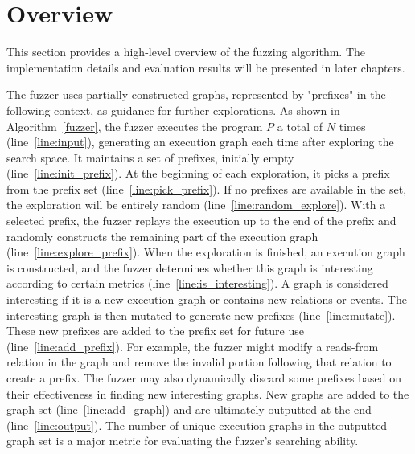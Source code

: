 \section{Overview}



This section provides a high-level overview of the fuzzing algorithm. The implementation details and evaluation results will be presented in later chapters.





The fuzzer uses partially constructed graphs, represented by "prefixes" in the following context, as guidance for further explorations. As shown in Algorithm~\ref{fuzzer}, the fuzzer executes the program $P$ a total of $N$ times (line~\ref{line:input}), generating an execution graph each time after exploring the search space. It maintains a set of prefixes, initially empty (line~\ref{line:init_prefix}). At the beginning of each exploration, it picks a prefix from the prefix set (line~\ref{line:pick_prefix}). If no prefixes are available in the set, the exploration will be entirely random (line~\ref{line:random_explore}). With a selected prefix, the fuzzer replays the execution up to the end of the prefix and randomly constructs the remaining part of the execution graph (line~\ref{line:explore_prefix}). When the exploration is finished, an execution graph is constructed, and the fuzzer determines whether this graph is interesting according to certain metrics (line~\ref{line:is_interesting}). A graph is considered interesting if it is a new execution graph or contains new relations or events. The interesting graph is then mutated to generate new prefixes (line~\ref{line:mutate}). These new prefixes are added to the prefix set for future use (line~\ref{line:add_prefix}). For example, the fuzzer might modify a reads-from relation in the graph and remove the invalid portion following that relation to create a prefix. The fuzzer may also dynamically discard some prefixes based on their effectiveness in finding new interesting graphs. New graphs are added to the graph set (line~\ref{line:add_graph}) and are ultimately outputted at the end (line~\ref{line:output}). The number of unique execution graphs in the outputted graph set is a major metric for evaluating the fuzzer's searching ability.




